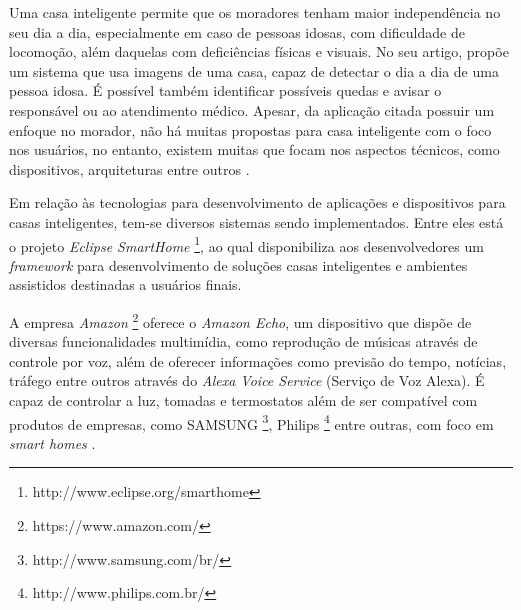 




Uma casa inteligente permite que os moradores tenham maior independência no seu dia a dia, especialmente em caso de pessoas idosas, com dificuldade de locomoção, além daquelas com deficiências físicas e visuais.
No seu artigo,  propõe um sistema que usa imagens de uma casa, capaz de detectar o dia a dia de uma pessoa idosa. É possível também identificar possíveis quedas e avisar o responsável ou ao atendimento médico. Apesar, da aplicação citada possuir um enfoque no morador, não há muitas propostas para casa inteligente com o foco nos usuários, no entanto, existem muitas que focam nos aspectos técnicos, como dispositivos, arquiteturas entre outros \cite{Wilson2015}.


Em relação às tecnologias para desenvolvimento de aplicações e dispositivos para casas inteligentes, tem-se diversos sistemas sendo implementados. Entre eles está o projeto \textit{Eclipse SmartHome} \textsuperscript{\texttrademark}
\footnote{http://www.eclipse.org/smarthome}, ao qual disponibiliza aos desenvolvedores um \textit{framework} para desenvolvimento de soluções casas inteligentes e ambientes assistidos destinadas a usuários finais. 
    

A empresa \textit{Amazon} \textsuperscript{\textregistered}
\footnote{https://www.amazon.com/} oferece o \textit{Amazon Echo}, um dispositivo que dispõe de diversas funcionalidades multimídia, como reprodução de músicas através de controle por voz, além de oferecer informações como previsão do tempo, notícias, tráfego entre outros através do \textit{Alexa Voice Service} (Serviço de Voz Alexa). É capaz de controlar a luz, tomadas e termostatos além de ser compatível com produtos de empresas, como SAMSUNG\textsuperscript{\textregistered}
\footnote{http://www.samsung.com/br/}, Philips{\textregistered}
\footnote{http://www.philips.com.br/} entre outras, com foco em \textit{smart homes} \cite{amazon2017}.

